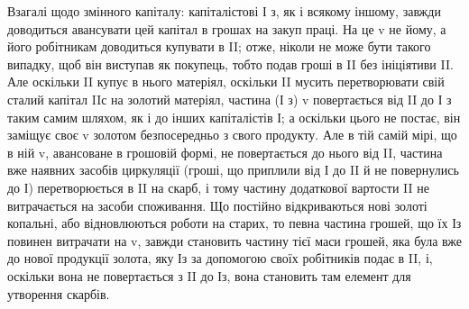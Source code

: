 Взагалі щодо змінного капіталу: капіталістові І з, як і всякому
іншому, завжди доводиться авансувати цей капітал в грошах на закуп
праці. На це v не йому, а його робітникам доводиться купувати в II; отже,
ніколи не може бути такого випадку, щоб він виступав як покупець,
тобто подав гроші в II без ініціятиви II. Але оскільки II купує в нього
матеріял, оскільки II мусить перетворювати свій сталий капітал IIс на золотий
матеріял, частина (І з) v повертається від II до І з таким самим шляхом,
як і до інших капіталістів І; а оскільки цього не постає, він заміщує своє v
золотом безпосередньо з свого продукту. Але в тій самій мірі, що в ній v,
авансоване в грошовій формі, не повертається до нього від II, частина
вже наявних засобів циркуляції (гроші, що приплили від І до II й не повернулись
до І) перетворюється в II на скарб, і тому частину додаткової
вартости II не витрачається на засоби споживання. Що постійно відкриваються
нові золоті копальні, або відновлюються роботи на старих,
то певна частина грошей, що їх Із повинен витрачати на v, завжди
становить частину тієї маси грошей, яка була вже до нової продукції
золота, яку Із за допомогою своїх робітників подає в II, і, оскільки
вона не повертається з II до Із, вона становить там елемент для
утворення скарбів.
